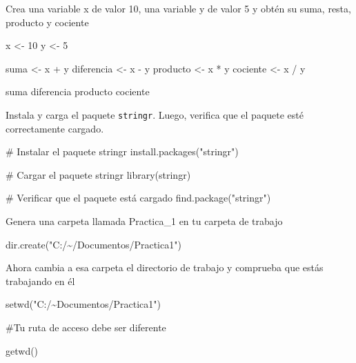 \documentclass[
  letterpaper,
]{scrbook}
\newenvironment{Shaded}{\begin{snugshade}}{\end{snugshade}}
\newcommand{\CommentTok}[1]{\textcolor[rgb]{0.37,0.37,0.37}{#1}}
\newcommand{\DecValTok}[1]{\textcolor[rgb]{0.68,0.00,0.00}{#1}}
\newcommand{\FunctionTok}[1]{\textcolor[rgb]{0.28,0.35,0.67}{#1}}
\newcommand{\NormalTok}[1]{\textcolor[rgb]{0.00,0.23,0.31}{#1}}
\newcommand{\OtherTok}[1]{\textcolor[rgb]{0.00,0.23,0.31}{#1}}
\newcommand{\SpecialCharTok}[1]{\textcolor[rgb]{0.37,0.37,0.37}{#1}}
\newcommand{\StringTok}[1]{\textcolor[rgb]{0.13,0.47,0.30}{#1}}
\begin{document}
Crea una variable x de valor 10, una variable y de valor 5 y obtén su
suma, resta, producto y cociente

\begin{Shaded}
\begin{Highlighting}[]
\NormalTok{x }\OtherTok{\textless{}{-}} \DecValTok{10}
\NormalTok{y }\OtherTok{\textless{}{-}} \DecValTok{5}

\NormalTok{suma }\OtherTok{\textless{}{-}}\NormalTok{ x }\SpecialCharTok{+}\NormalTok{ y}
\NormalTok{diferencia }\OtherTok{\textless{}{-}}\NormalTok{ x }\SpecialCharTok{{-}}\NormalTok{ y}
\NormalTok{producto }\OtherTok{\textless{}{-}}\NormalTok{ x }\SpecialCharTok{*}\NormalTok{ y}
\NormalTok{cociente }\OtherTok{\textless{}{-}}\NormalTok{ x }\SpecialCharTok{/}\NormalTok{ y}

\NormalTok{suma }
\NormalTok{diferencia}
\NormalTok{producto }
\NormalTok{cociente }
\end{Highlighting}
\end{Shaded}

Instala y carga el paquete \texttt{stringr}. Luego, verifica que el
paquete esté correctamente cargado.

\begin{Shaded}
\begin{Highlighting}[]
\CommentTok{\# Instalar el paquete stringr }
\FunctionTok{install.packages}\NormalTok{(}\StringTok{"stringr"}\NormalTok{)}

\CommentTok{\# Cargar el paquete stringr}
\FunctionTok{library}\NormalTok{(stringr)}

\CommentTok{\# Verificar que el paquete está cargado}
\FunctionTok{find.package}\NormalTok{(}\StringTok{"stringr"}\NormalTok{)}
\end{Highlighting}
\end{Shaded}

Genera una carpeta llamada Practica\_1 en tu carpeta de trabajo

\begin{Shaded}
\begin{Highlighting}[]
\FunctionTok{dir.create}\NormalTok{(}\StringTok{"C:/\textasciitilde{}/Documentos/Practica1"}\NormalTok{)}
\end{Highlighting}
\end{Shaded}

Ahora cambia a esa carpeta el directorio de trabajo y comprueba que
estás trabajando en él

\begin{Shaded}
\begin{Highlighting}[]
\FunctionTok{setwd}\NormalTok{(}\StringTok{"C:/\textasciitilde{}Documentos/Practica1"}\NormalTok{)}

\CommentTok{\#Tu ruta de acceso debe ser diferente}

\FunctionTok{getwd}\NormalTok{()}
\end{Highlighting}
\end{Shaded}
\end{document}
